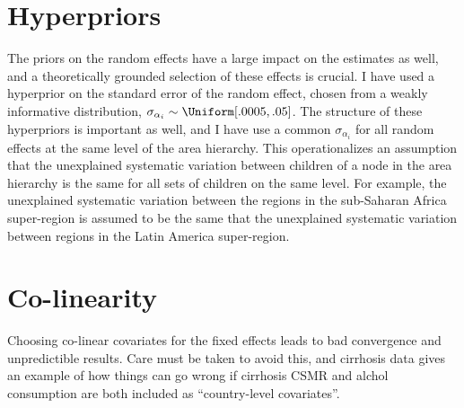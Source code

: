 \section{Hyperpriors}
The priors on the random effects have a large impact on the estimates
as well, and a theoretically grounded selection of these effects is
crucial.  I have used a hyperprior on the standard error of the random
effect, chosen from a weakly informative distribution, $\sigma_{\alpha_i}
\sim \Uniform[.0005, .05]$.  The structure of these hyperpriors is
important as well, and I have use a common $\sigma_{\alpha_i}$ for all
random effects at the same level of the area hierarchy.  This
operationalizes an assumption that the unexplained systematic variation between
children of a node in the area hierarchy is the same for all sets of
children on the same level.  For example, the unexplained systematic
variation between the regions in the sub-Saharan Africa super-region
is assumed to be the same that the unexplained systematic variation
between regions in the Latin America super-region.

\section{Co-linearity}
Choosing co-linear covariates for the fixed effects leads to bad
convergence and unpredictible results.  Care must be taken to avoid
this, and cirrhosis data gives an example of how things can go wrong
if cirrhosis CSMR and alchol consumption are both included as
``country-level covariates''.

